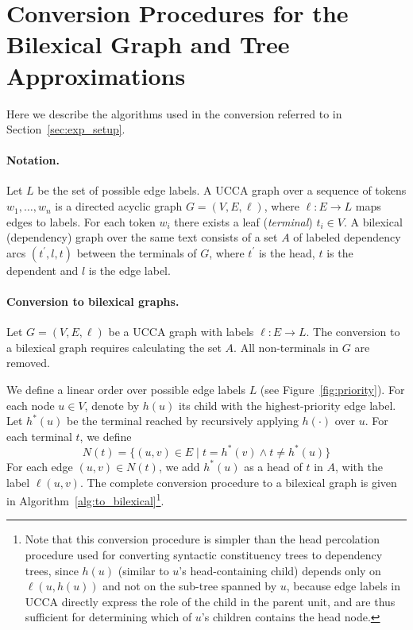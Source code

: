 \documentclass[11pt,a4paper]{article}
\newcommand{\secref}[1]{Section~\ref{#1}}
\newcommand{\figref}[1]{Figure~\ref{#1}}
\begin{document}
\section{Conversion Procedures for the Bilexical Graph and Tree Approximations}
\label{appendix:conversion}

Here we describe the algorithms used in the conversion referred to in \secref{sec:exp_setup}.

\paragraph{Notation.}
Let $L$ be the set of possible edge labels.
A UCCA graph over a sequence of tokens $w_1, \ldots, w_n$ is a directed acyclic graph
$G=(V,E, \ell)$, where $\ell:E\to L$ maps edges to labels.
For each token $w_i$ there exists a leaf (\emph{terminal}) $t_i \in V$.
A bilexical (dependency) graph over the same text consists of a set $A$ of
labeled dependency arcs $(t^\prime,l,t)$
between the terminals of $G$, where $t^\prime$ is the head, $t$ is the dependent and $l$ is
the edge label.

\paragraph{Conversion to bilexical graphs.}
Let $G=(V,E,\ell)$ be a UCCA graph with labels $\ell:E\rightarrow L$.
The conversion to a bilexical graph requires calculating the set $A$.
All non-terminals in $G$ are removed.

We define a linear order over possible edge labels $L$ (see \figref{fig:priority}).
For each node $u \in V$, denote by $h(u)$ its child with the highest-priority edge label.
Let $h^*(u)$ be the terminal reached by recursively applying $h(\cdot)$ over $u$.
For each terminal $t$, we define
\[
N(t) = \{(u,v)\in E \;|\; t=h^*(v) \wedge t \neq h^*(u) \}
\]
For each edge $(u,v)\in N(t)$, we add $h^*(u)$ as a head of $t$ in $A$,
with the label $\ell(u,v)$.
The complete conversion procedure to a bilexical graph is given in
Algorithm~\ref{alg:to_bilexical}\footnote{Note that this conversion procedure
is simpler than the head percolation procedure used for converting syntactic constituency
trees to dependency trees,
since $h(u)$ (similar to $u$'s head-containing child)
depends only on $\ell(u,h(u))$ and not on the sub-tree spanned by $u$,
because edge labels in UCCA directly express the role of the child in the parent unit, and
are thus sufficient for determining which of $u$'s children contains the head node.}.
\end{document}

